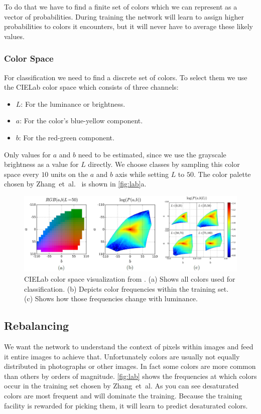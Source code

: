 \documentclass[11pt]{article}
\begin{document}
To do that we have to find a finite set of colors which we can represent as a vector of probabilities. During training the network will learn to assign higher probabilities to colors it encounters, but it will never have to average these likely values.

\subsubsection*{Color Space}
For classification we need to find a discrete set of colors. To select them we use the CIELab color space which consists of three channels:
\begin{itemize}
    \item $L$: For the luminance or brightness.
    \item $a$: For the color's blue-yellow component.
    \item $b$: For the red-green component.
\end{itemize}
Only values for $a$ and $b$ need to be estimated, since we use the grayscale brightness as a value for $L$ directly. We choose classes by sampling this color space every $10$ units on the $a$ and $b$ axis while setting $L$ to $50$. The color palette chosen by Zhang~et~al.~\cite{zhang2016colorful} is shown in \autoref{fig:lab}a.

\begin{figure}[tbp]
    \includegraphics[width=\textwidth]{latex/lab.jpg}
    \caption{CIELab color space visualization from \cite{zhang2016colorful}. (a) Shows all colors used for classification. (b) Depicts color frequencies within the training set. (c) Shows how those frequencies change with luminance.}
    \label{fig:lab}
\end{figure}

\subsection{Rebalancing}
\label{chap:rebalancing}
We want the network to understand the context of pixels within images and feed it entire images to achieve that. Unfortunately colors are usually not equally distributed in photographs or other images. In fact some colors are more common than others by orders of magnitude. \autoref{fig:lab} shows the frequencies at which colors occur in the training set chosen by Zhang~et~al\cite{zhang2016colorful}. As you can see desaturated colors are most frequent and will dominate the training. Because the training facility is rewarded for picking them, it will learn to predict desaturated colors.
\end{document}
